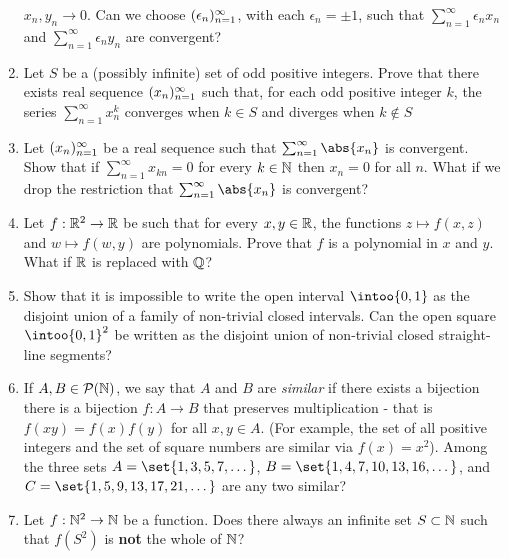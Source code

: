 \documentclass[12pt,a4paper]{article}
\begin{document}
\begin{enumerate}
       \(x_n, y_n \to 0\). Can we choose \((\epsilon _n)_{n = 1}^{\infty}\), with each
       \(\epsilon_n = \pm 1\), such that
       \(\sum_{n = 1}^\infty \epsilon_n x_n\) and
       \(\sum_{n = 1}^\infty \epsilon_n y_n\) are convergent?
 \item Let \(S\) be a (possibly infinite) set of odd positive integers. Prove
       that there exists real sequence \((x _n)_{n = 1}^{\infty}\) such that, for each odd
       positive integer \(k\), the series \(\sum_{n = 1}^\infty x_n^k\)
       converges when \(k \in S\) and diverges when \(k \not\in S\)
 \item Let \((x _n)_{n = 1}^{\infty}\) be a real sequence such that
       \(\sum_{n = 1}^\infty \abs{x_n}\) is convergent. Show that if
       \(\sum_{n = 1}^\infty x_{kn} = 0\) for every \(k \in \mathbb N\) then
       \(x_n = 0\) for all \(n\). What if we drop the restriction that
       \(\sum_{n = 1}^\infty \abs{x_n}\) is convergent?
 \item Let \(f: \mathbb R^2 \to \mathbb R\) be such that for every \(x, y \in \mathbb R\), the
       functions \(z \mapsto f(x, z)\) and \(w \mapsto f(w, y)\) are
       polynomials. Prove that \(f\) is a polynomial in \(x\) and \(y\). What if
       \(\mathbb R\) is replaced with \(\mathbb Q\)?
 \item Show that it is impossible to write the open interval
       \(\intoo{0, 1}\) as the
       disjoint union of a family of non-trivial closed intervals. Can the open
       square \(\intoo{0, 1}^2\) be written as the disjoint union of non-trivial
       closed straight-line segments?
 \item If \(A, B \in \mathcal P(\mathbb N)\), we say that \(A\) and \(B\) are
       \emph{similar} if there exists a bijection there is a bijection
       \(f: A \to B\) that preserves multiplication - that is
       \(f(xy) = f(x)f(y)\) for all \(x, y \in A\). (For example, the set of all
       positive integers and the set of square numbers are similar via
       \(f(x) = x^2\)). Among the three sets \(A = \set{1, 3, 5, 7, \dotsc}\),
       \(B = \set{1, 4, 7, 10, 13, 16, \dotsc}\),
       and \(C = \set{1, 5, 9, 13, 17, 21, \dotsc}\) are any two similar?
 \item Let \(f : \mathbb N^2 \to \mathbb N\) be a function. Does there always an infinite
       set \(S \subset \mathbb N\) such that \(f(S^2)\) is \textbf{not} the whole of
       \(\mathbb N\)?
\end{enumerate}
\end{document}
